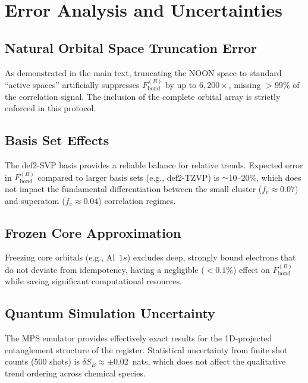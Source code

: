 \documentclass[12pt,a4paper]{article}
\begin{document}
\section{Error Analysis and Uncertainties}

\subsection{Natural Orbital Space Truncation Error}

As demonstrated in the main text, truncating the NOON space to standard
``active spaces'' artificially suppresses $F_{\text{bond}}^{(B)}$ by up
to $6{,}200\times$, missing $> 99\%$ of the correlation signal. The
inclusion of the complete orbital array is strictly enforced in this
protocol.

\subsection{Basis Set Effects}

The def2-SVP basis provides a reliable balance for relative trends.
Expected error in $F_{\text{bond}}^{(B)}$ compared to larger basis sets
(e.g., def2-TZVP) is $\sim$10--20\%, which does not impact the
fundamental differentiation between the small cluster
($f_e \approx 0.07$) and superatom ($f_e \approx 0.04$) correlation
regimes.

\subsection{Frozen Core Approximation}

Freezing core orbitals (e.g., Al~$1s$) excludes deep, strongly bound
electrons that do not deviate from idempotency, having a negligible
($< 0.1\%$) effect on $F_{\text{bond}}^{(B)}$ while saving significant
computational resources.

\subsection{Quantum Simulation Uncertainty}

The MPS emulator provides effectively exact results for the 1D-projected
entanglement structure of the register. Statistical uncertainty from
finite shot counts (500 shots) is $\delta S_E \approx \pm 0.02$~nats,
which does not affect the qualitative trend ordering across chemical
species.
\end{document}
